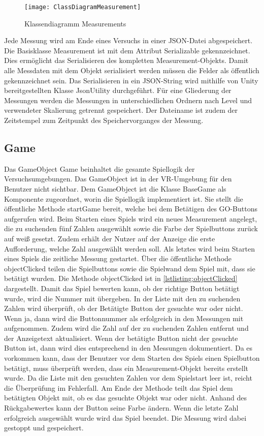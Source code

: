 \begin{figure}[!htbp]
	\centering
	\texttt{[image: ClassDiagramMeasurement]}
	\caption[Klassendiagramm Measurements]{Klassendiagramm Measurements}
	\label{fig:ClassDiagramMeasurement}
\end{figure}

Jede Messung wird am Ende eines Versuchs in einer JSON-Datei abgespeichert. Die Basisklasse Measurement ist mit dem Attribut Serializable gekennzeichnet. Dies ermöglicht das Serialisieren des kompletten Measurement-Objekts. Damit alle Messdaten mit dem Objekt serialisiert werden müssen die Felder als öffentlich gekennzeichnet sein. Das Serialisieren in ein JSON-String wird mithilfe von Unity bereitgestellten Klasse JsonUtility durchgeführt. Für eine Gliederung der Messungen werden die Messungen in unterschiedlichen Ordnern nach Level und verwendeter Skalierung getrennt gespeichert. Der Dateiname ist zudem der Zeitstempel zum Zeitpunkt des Speichervorganges der Messung.

\subsection{Game}
\label{section:game}
Das GameObject \glqq Game\grqq{} beinhaltet die gesamte Spiellogik der Versuchsumgebungen. Das GameObject ist in der \ac{VR}-Umgebung für den Benutzer nicht sichtbar. Dem GameObject ist die Klasse {\ttfamily BaseGame} als Komponente zugeordnet, worin die Spiellogik implementiert ist. Sie stellt die öffentliche Methode {\ttfamily startGame} bereit, welche bei dem Betätigen des GO-Buttons aufgerufen wird. Beim Starten eines Spiels wird ein neues Measurement angelegt, die zu suchenden fünf Zahlen ausgewählt sowie die Farbe der Spielbuttons zurück auf weiß gesetzt. Zudem erhält der Nutzer auf der Anzeige die erste Aufforderung, welche Zahl ausgewählt werden soll. Als letztes wird beim Starten eines Spiels die zeitliche Messung gestartet. Über die öffentliche Methode {\ttfamily objectClicked} teilen die Spielbuttons sowie die Spielwand dem Spiel mit, dass sie betätigt wurden. Die Methode objectClicked ist in \autoref{lstlisting:objectClicked} dargestellt. Damit das Spiel bewerten kann, ob der richtige Button betätigt wurde, wird die Nummer mit übergeben. In der Liste mit den zu suchenden Zahlen wird überprüft, ob der Betätigte Button der gesuchte war oder nicht. Wenn ja, dann wird die Buttonnummer als erfolgreich in den Messungen mit aufgenommen. Zudem wird die Zahl auf der zu suchenden Zahlen entfernt und der Anzeigetext aktualisiert. Wenn der betätigte Button nicht der gesuchte Button ist, dann wird dies entsprechend in den Messungen dokumentiert. Da es vorkommen kann, dass der Benutzer vor dem Starten des Spiels einen Spielbutton betätigt, muss überprüft werden, dass ein Measurement-Objekt bereits erstellt wurde. Da die Liste mit den gesuchten Zahlen vor dem Spielstart leer ist, reicht die Überprüfung im Fehlerfall. Am Ende der Methode teilt das Spiel dem betätigten Objekt mit, ob es das gesuchte Objekt war oder nicht. Anhand des Rückgabewertes kann der Button seine Farbe ändern. Wenn die letzte Zahl erfolgreich ausgewählt wurde wird das Spiel beendet. Die Messung wird dabei gestoppt und gespeichert.\\


